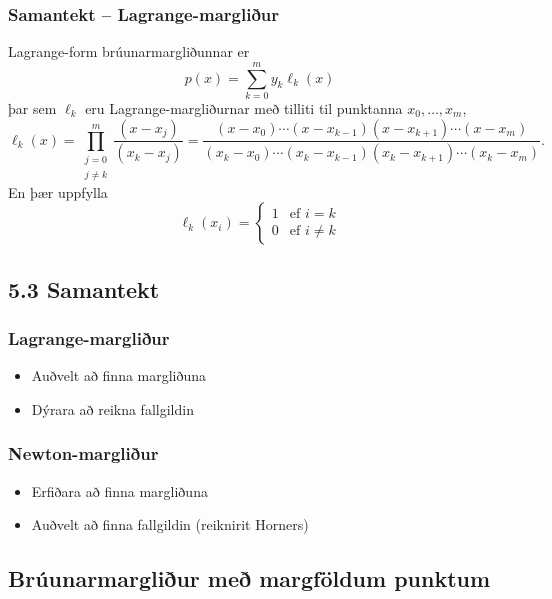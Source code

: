 \documentclass[icelandic,a4paper,12pt]{article}
\begin{document}
\subsubsection{Samantekt -- Lagrange-margliður} 
Lagrange-form brúunarmargliðunnar er
$$
p(x)=\sum_{k=0}^m y_k\ell_{k}(x)
$$
þar sem $\ell_{k}$ eru Lagrange-margliðurnar með tilliti til
punktanna $x_0,\dots,x_m$,
{\small
\begin{equation*}
	\ell_{k}(x) = \prod_
	{\substack{j=0\\ j\neq k}}^m\dfrac{(x-x_j)}{(x_k-x_j)}
	= \dfrac{(x-x_0)\cdots(x-x_{k-1})
		(x-x_{k+1})\cdots(x-x_m)}
	{(x_k-x_0)\cdots(x_k-x_{k-1})
		(x_k-x_{k+1})\cdots(x_k-x_m)}.
\end{equation*}
}
\pause
En þær uppfylla
\begin{equation*}
  \ell_{k}(x_i) = \left\{ \begin{array}{cc}
      1 & \text{ef } i = k \\
      0 & \text{ef } i \not= k
  \end{array} \right.
\end{equation*}



\subsection{5.3 Samantekt}
\subsubsection{Lagrange-margliður}
 \begin{itemize}
  \item Auðvelt að finna margliðuna
  \item Dýrara að reikna fallgildin
 \end{itemize}


\subsubsection{Newton-margliður}
 \begin{itemize}
  \item Erfiðara að finna margliðuna
  \item Auðvelt að finna fallgildin (reiknirit Horners)
 \end{itemize}


\subsection{Brúunarmargliður með margföldum punktum} 
\end{document}
